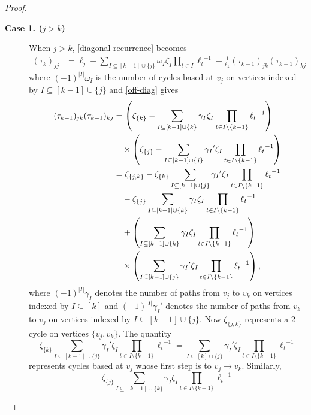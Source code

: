 \documentclass[10pt,a4paper]{amsart}
\begin{document}
\begin{proof}
\begin{description}
\item [{\bf Case 1. ($j>k$)}]
When $j>k$, \eqref{diagonal recurrence} becomes
\begin{align*}
(\tau_k)_{jj}&=\ell_j-\sum_{I\subseteq [k-1]\cup\{j\}}\omega_I\zeta_I\prod_{t\in I}{\ell_t}^{-1}-\frac{1}{\ell_k}(\tau_{k-1})_{jk}(\tau_{k-1})_{kj}
\end{align*}
where $(-1)^{|I|}\omega_I$ is the number of cycles based at $v_j$ on vertices indexed by $I\subseteq[k-1]\cup\{j\}$ and \eqref{off-diag} gives
\begin{align*}
(\tau_{k-1})_{jk}(\tau_{k-1})_{kj}&=\left(\zeta_{\{k\}}-\sum_{I\subseteq [k-1]\cup\{k\}}\gamma_I\zeta_I\prod_{t\in I\setminus\{k-1\}}{\ell_t}^{-1}\right)\\
&\hskip10pt\times\left(\zeta_{\{j\}}-\sum_{I\subseteq [k-1]\cup\{j\}}{\gamma_I}'\zeta_I\prod_{t\in I\setminus\{k-1\}}{\ell_t}^{-1}\right)\\
&=\zeta_{\{j,k\}}-\zeta_{\{k\}}\sum_{I\subseteq [k-1]\cup\{j\}}{\gamma_I}'\zeta_I\prod_{t\in I\setminus\{k-1\}}{\ell_t}^{-1}\\
&\hskip10pt -\zeta_{\{j\}}\sum_{I\subseteq [k-1]\cup\{k\}}\gamma_I\zeta_I\prod_{t\in I\setminus\{k-1\}}{\ell_t}^{-1}\\
&\hskip10pt+\left(\sum_{I\subseteq [k-1]\cup\{k\}}\gamma_I\zeta_I\prod_{t\in I\setminus\{k-1\}}{\ell_t}^{-1}\right)\\
&\hskip10pt\times\left(\sum_{I\subseteq [k-1]\cup\{j\}}{\gamma_I}'\zeta_I\prod_{t\in I\setminus\{k-1\}}{\ell_t}^{-1}\right),
\end{align*}
where $(-1)^{|I|}\gamma_I$ denotes the number of paths from $v_j$ to $v_k$ on vertices indexed by $I\subseteq [k]$ and $(-1)^{|I|}{\gamma_I}'$ denotes the number of paths from $v_k$ to $v_j$ on vertices indexed by $I\subseteq [k-1]\cup \{j\}$.  Now $\zeta_{\{j,k\}}$ represents a 2-cycle on vertices $\{v_j, v_k\}$.  The quantity \begin{equation*}
\zeta_{\{k\}}\sum_{I\subseteq [k-1]\cup\{j\}}{\gamma_I}'\zeta_I\prod_{t\in I\setminus\{k-1\}}{\ell_t}^{-1}=\sum_{I\subseteq [k]\cup\{j\}}{\gamma_I}'\zeta_I\prod_{t\in I\setminus\{k-1\}}{\ell_t}^{-1}
\end{equation*}
represents cycles based at $v_j$ whose first step is to $v_j\to v_k$.  Similarly, 
\begin{equation*}
\zeta_{\{j\}}\sum_{I\subseteq [k-1]\cup\{k\}}\gamma_I\zeta_I\prod_{t\in I\setminus\{k-1\}}{\ell_t}^{-1}
\end{equation*}

\end{description}
\end{proof}
\end{document}
